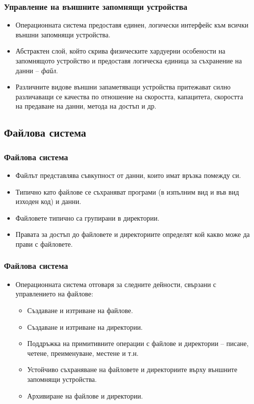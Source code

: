 \documentclass[ignorenonframetext, hyperref=unicode]{beamer}
\begin{document}
\begin{frame}
\frametitle{Управление на външните запомнящи устройства}
\begin{itemize}
\item Операционната система предоставя единен, логически интерфейс към всички
външни запомнящи устройства.
\item Абстрактен слой, който скрива физическите хардуерни особености на
запомнящото устройство и предоставя логическа единица за съхранение на данни --
{\em файл}.
\item Различните видове външни запаметяващи устройства притежават силно
различаващи се качества по отношение на скоростта, капацитета, скоростта на
предаване на данни, метода на достъп и др.
\end{itemize}
\end{frame}

\subsection{Файлова система}

\begin{frame}
\frametitle{Файлова система}
\begin{itemize}
\item Файлът представлява съвкупност от данни, които имат връзка помежду си.
\item Типично като файлове се съхраняват програми (в изпълним вид и във вид
изходен код) и данни.
\item Файловете типично са групирани в директории.
\item Правата за достъп до файловете и директориите определят кой какво може да
прави с файловете.
\end{itemize}
\end{frame}

\begin{frame}
\frametitle{Файлова система}
\begin{itemize}
\item Операционната система отговаря за следните дейности, свързани с
управлението на файлове:
\begin{itemize}
  \item Създаване и изтриване на файлове.
  \item Създаване и изтриване на директории.
  \item Поддръжка на примитивните операции с файлове и директории -- писане,
  четене, преименуване, местене и т.н.
  \item Устойчиво съхраняване на файловете и директориите върху външните
  запомнящи устройства.
  \item Архивиране на файлове и директории.
\end{itemize}
\end{itemize}
\end{frame}
\end{document}
